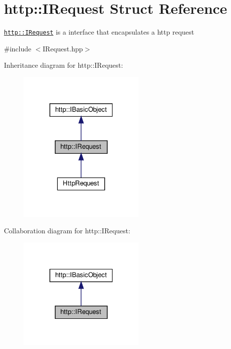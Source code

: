 \hypertarget{structhttp_1_1IRequest}{}\section{http\+:\+:I\+Request Struct Reference}
\label{structhttp_1_1IRequest}


\href{http::IRequest}{\tt http\+::\+I\+Request} is a interface that encapsulates a http request  




{\ttfamily \#include $<$I\+Request.\+hpp$>$}



Inheritance diagram for http\+:\+:I\+Request\+:
\nopagebreak
\begin{figure}[H]
\begin{center}
\leavevmode
\includegraphics[width=175pt]{structhttp_1_1IRequest__inherit__graph}
\end{center}
\end{figure}


Collaboration diagram for http\+:\+:I\+Request\+:
\nopagebreak
\begin{figure}[H]
\begin{center}
\leavevmode
\includegraphics[width=175pt]{structhttp_1_1IRequest__coll__graph}
\end{center}
\end{figure}
